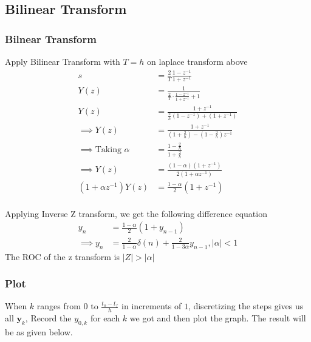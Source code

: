 \documentclass{beamer}
\providecommand{\brak}[1]{\ensuremath{\left(#1\right)}}
\theoremstyle{remark}
\providecommand{\abs}[1]{\left\vert#1\right\vert}
\let\vec\mathbf
\numberwithin{equation}{section}
\begin{document}
\subsection{Bilinear Transform}
\begin{frame}
    \frametitle{Bilnear Transform}
    Apply Bilinear Transform with $T=h$ on laplace transform above
\begin{align}
    s&=\frac{2}{T}\frac{1-z^{-1}}{1+z^{-1}}\\
    Y\brak{z}&=\frac{1}{\frac{2}{T}\cdot\frac{1-z^{-1}}{1+z^{-1}}+1}\\
    Y\brak{z}&=\frac{1+z^{-1}}{\frac{2}{h}\brak{1-z^{-1}}+\brak{1+z^{-1}}}\\
    \implies Y\brak{z}&=\frac{1+z^{-1}}{\brak{1+\frac{2}{h}}-\brak{1-\frac{2}{h}}z^{-1}}\\
    \implies \text{Taking }\alpha&=\frac{1-\frac{2}{h}}{1+\frac{2}{h}}\\
    \implies Y\brak{z}&=\frac{\brak{1-\alpha}\brak{1+z^{-1}}}{2\brak{1+\alpha z^{-1}}}\\
    \brak{1+\alpha z^{-1}}Y\brak{z}&=\frac{1-\alpha}{2}\brak{1+z^{-1}}\\
\end{align}
\end{frame}
\begin{frame}
Applying Inverse Z transform, we get the following difference equation
\begin{align}
    y_n&=\frac{1-\alpha}{2}\brak{1+y_{n-1}}\\
    \implies y_n&=\frac{2}{1-\alpha}\delta\brak{n}+\frac{2}{1-3\alpha}y_{n-1},\abs{\alpha}<1
\end{align}
The ROC of the z transform is $\abs{Z}>\abs{\alpha}$
\end{frame}
\begin{frame}[fragile]
\frametitle{Plot}
When $k$ ranges from $0$ to $\frac{t_o-t_f}{h}$ in increments of $1$, discretizing the steps gives us all $\vec{y}_k$, Record the $y_{0,k}$ for each $k$ we got and then plot the graph. The result will be as given below.\\
\end{frame}
\end{document}
